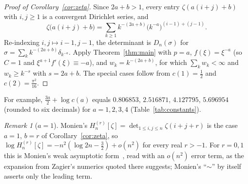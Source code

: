 \documentclass{amsart}
\theoremstyle{definition}
\theoremstyle{remark}
\newtheorem{remark}[theorem]{Remark}
\numberwithin{equation}{section}
\begin{document}
\begin{proof}[Proof of Corollary~\ref{cor:zeta}]
Since $2a+b>1$, every entry $\zeta(a(i+j)+b)$ with $i,j\ge1$ is a convergent Dirichlet series, and
\[
  \zeta\bigl(a(i+j)+b\bigr)=\sum_{k\ge1}k^{-(2a+b)}\bigl(k^{-a}\bigr)^{(i-1)+(j-1)} .
\]
Re-indexing $i,j\mapsto i-1,j-1$, the determinant is $D_n(\sigma)$ for $\sigma=\sum_kk^{-(2a+b)}\delta_{k^{-a}}$.
Apply Theorem~\ref{thm:main} with $p=a$, $f(\xi)=\xi^{-a}$ (so $C=1$ and $\xi^{a+1}f'(\xi)\equiv-a$), and
$w_k=k^{-(2a+b)}$, for which $\sum_kw_k<\infty$ and $w_k\ge k^{-s}$ with $s=2a+b$. The special cases follow from
$c(1)=\frac12$ and $c(2)=\frac{\pi^2}{16}$.
\end{proof}

For example, $\frac{3a}{2}+\log c(a)$ equals $0.806853$, $2.516871$, $4.127795$, $5.696954$ (rounded to six decimals)
for $a=1,2,3,4$ (Table~\ref{tab:constants}).

\begin{remark}[$a=1$]\label{rem:a1}
Monien's $H_n^{(r)}[\zeta]=\det_{1\le i,j\le n}\zeta(i+j+r)$ is the case $a=1$, $b=r$ of Corollary~\ref{cor:zeta}, so
$\log H_n^{(r)}[\zeta]=-n^2(\log2n-\frac32)+o(n^2)$ for every real $r>-1$. For $r=0,1$ this is Monien's weak
asymptotic form~\cite{Monien}, read with an $o(n^2)$ error term, as the expansion from Zagier's numerics quoted there
suggests; Monien's ``$\sim$'' by itself asserts only the leading term.
\end{remark}
\end{document}
